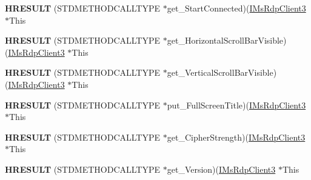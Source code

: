 \begin{DoxyCompactItemize}
\item 
\mbox{\label{struct_m_s_t_s_c_lib_1_1_i_ms_rdp_client3_vtbl_a22577f0a95ea380772a8c824635e1015}} 
{\bfseries H\+R\+E\+S\+U\+LT} (S\+T\+D\+M\+E\+T\+H\+O\+D\+C\+A\+L\+L\+T\+Y\+PE $\ast$get\+\_\+\+Start\+Connected)(\hyperlink{interface_m_s_t_s_c_lib_1_1_i_ms_rdp_client3}{I\+Ms\+Rdp\+Client3} $\ast$This
\item 
\mbox{\label{struct_m_s_t_s_c_lib_1_1_i_ms_rdp_client3_vtbl_ac2905cc06c0e9ac4e1b8e82cdb41a6e5}} 
{\bfseries H\+R\+E\+S\+U\+LT} (S\+T\+D\+M\+E\+T\+H\+O\+D\+C\+A\+L\+L\+T\+Y\+PE $\ast$get\+\_\+\+Horizontal\+Scroll\+Bar\+Visible)(\hyperlink{interface_m_s_t_s_c_lib_1_1_i_ms_rdp_client3}{I\+Ms\+Rdp\+Client3} $\ast$This
\item 
\mbox{\label{struct_m_s_t_s_c_lib_1_1_i_ms_rdp_client3_vtbl_a8931ef7f9e44badc2c18ff3c9e62b835}} 
{\bfseries H\+R\+E\+S\+U\+LT} (S\+T\+D\+M\+E\+T\+H\+O\+D\+C\+A\+L\+L\+T\+Y\+PE $\ast$get\+\_\+\+Vertical\+Scroll\+Bar\+Visible)(\hyperlink{interface_m_s_t_s_c_lib_1_1_i_ms_rdp_client3}{I\+Ms\+Rdp\+Client3} $\ast$This
\item 
\mbox{\label{struct_m_s_t_s_c_lib_1_1_i_ms_rdp_client3_vtbl_adc56928775263e305103a2ed7d2a7a59}} 
{\bfseries H\+R\+E\+S\+U\+LT} (S\+T\+D\+M\+E\+T\+H\+O\+D\+C\+A\+L\+L\+T\+Y\+PE $\ast$put\+\_\+\+Full\+Screen\+Title)(\hyperlink{interface_m_s_t_s_c_lib_1_1_i_ms_rdp_client3}{I\+Ms\+Rdp\+Client3} $\ast$This
\item 
\mbox{\label{struct_m_s_t_s_c_lib_1_1_i_ms_rdp_client3_vtbl_af637f41e98b26047a35fc844745148c9}} 
{\bfseries H\+R\+E\+S\+U\+LT} (S\+T\+D\+M\+E\+T\+H\+O\+D\+C\+A\+L\+L\+T\+Y\+PE $\ast$get\+\_\+\+Cipher\+Strength)(\hyperlink{interface_m_s_t_s_c_lib_1_1_i_ms_rdp_client3}{I\+Ms\+Rdp\+Client3} $\ast$This
\item 
\mbox{\label{struct_m_s_t_s_c_lib_1_1_i_ms_rdp_client3_vtbl_a8d8a71d36e25b29a79cc0ab7d6ea177c}} 
{\bfseries H\+R\+E\+S\+U\+LT} (S\+T\+D\+M\+E\+T\+H\+O\+D\+C\+A\+L\+L\+T\+Y\+PE $\ast$get\+\_\+\+Version)(\hyperlink{interface_m_s_t_s_c_lib_1_1_i_ms_rdp_client3}{I\+Ms\+Rdp\+Client3} $\ast$This

\end{DoxyCompactItemize}
